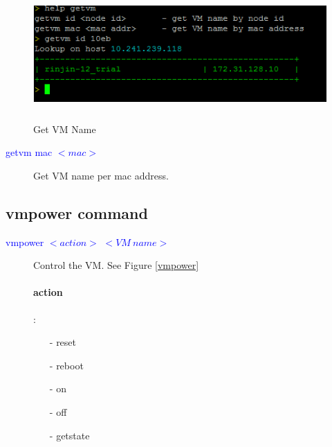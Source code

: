 \documentclass [12pt, a4paper, titlepage]{article}
\begin{document}
        \begin{figure}[H]
        \begin{center}
        \includegraphics[width=13cm,height=5cm]{png/getvm.png}
        \end{center}
        \caption{Get VM Name}
        \label{getvm}
        \end{figure}

        \begin{description}
            \item[\textcolor{blue}{getvm mac $<mac>$}] Get VM name per mac address.
        \end{description}

\subsection{vmpower command}
        \begin{description}
            \item[\textcolor{blue}{vmpower $<action>$ $<VM\ name>$}] Control the VM. See Figure \ref{vmpower}
                \paragraph {action}:
                \begin{enumerate}
                    \item[-] reset
                    \item[-] reboot
                    \item[-] on
                    \item[-] off
                    \item[-] getstate
                \end{enumerate}
        \end{description} 
\end{document}
